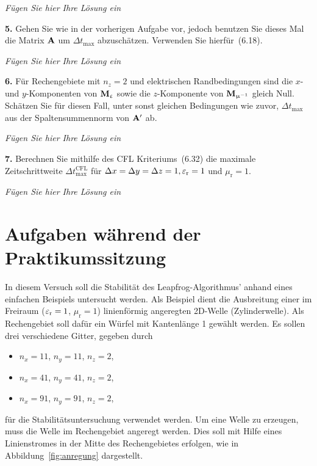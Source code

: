 \documentclass[Protokollheft.tex]{subfiles}
\begin{document}
\emph{Fügen Sie hier Ihre Lösung ein}

\begin{framed}
	\noindent \textbf{5.} Gehen Sie wie in der vorherigen Aufgabe vor, jedoch benutzen Sie
    dieses Mal die Matrix $ \mathbf{A} $ um $\Delta t_{\text{max}}$ abzuschätzen. Verwenden Sie hierfür~(6.18).\label{exer:approxEVofA}
\end{framed}

\emph{Fügen Sie hier Ihre Lösung ein}

\begin{framed}
	\noindent \textbf{6.} Für Rechengebiete mit $n_z=2$ und elektrischen
    Randbedingungen sind die $x$- und $y$-Komponenten von $\mathbf{M}_{\upvarepsilon}$ sowie die
    $z$-Komponente von $\mathbf{M}_{\upmu^{-1}}$ gleich Null. Schätzen Sie für diesen Fall,
    unter sonst gleichen Bedingungen wie zuvor, $\Delta t_{\text{max}}$ aus
    der Spaltensummennorm von $ \mathbf{A} '$ ab.\label{exer:approxDeltaTmax}
\end{framed}

\emph{Fügen Sie hier Ihre Lösung ein}

\begin{framed}
	\noindent \textbf{7.} Berechnen Sie mithilfe des CFL Kriteriums~(6.32) die maximale
    Zeitschrittweite $\Delta t_{\text{max}}^{\text{CFL}}$ für $\Delta x=\Delta
    y=\Delta z=1, \varepsilon_\text{r}=1$ und $\mu_\text{r}=1$.\label{exer:deltaTmaxCFL}
\end{framed}

\emph{Fügen Sie hier Ihre Lösung ein}

\section{Aufgaben während der Praktikumssitzung}
In diesem Versuch soll die Stabilität des Leapfrog-Algorithmus' anhand eines einfachen Beispiels untersucht werden.
Als Beispiel dient die Ausbreitung einer im Freiraum ($\varepsilon_\text{r}=1$, $\mu_\text{r}=1$) linienförmig angeregten 2D-Welle (Zylinderwelle). Als Rechengebiet soll dafür ein Würfel mit Kantenlänge 1 gewählt werden. Es sollen drei verschiedene Gitter, gegeben durch
\begin{itemize}
    \item $n_x=11$, $n_y=11$, $n_z=2$,
    \item $n_x=41$, $n_y=41$, $n_z=2$,
    \item $n_x=91$, $n_y=91$, $n_z=2$,
\end{itemize}
für die Stabilitätsuntersuchung verwendet werden. Um eine Welle zu erzeugen, muss die Welle im Rechengebiet angeregt werden. Dies soll mit Hilfe eines
Linienstromes in der Mitte des Rechengebietes erfolgen, wie in
Abbildung~\ref{fig:anregung} dargestellt.\\
\end{document}

